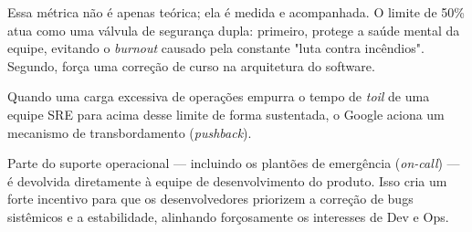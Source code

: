 \documentclass[12pt,a4paper,twoside]{report}
\begin{document}
Essa métrica não é apenas teórica; ela é medida e acompanhada. O limite de 50\% atua como uma válvula de segurança dupla: primeiro, protege a saúde mental da equipe, evitando o \emph{burnout} causado pela constante "luta contra incêndios". Segundo, força uma correção de curso na arquitetura do software. 

Quando uma carga excessiva de operações empurra o tempo de \emph{toil} de uma equipe SRE para acima desse limite de forma sustentada, o Google aciona um mecanismo de transbordamento (\emph{pushback}). 

Parte do suporte operacional --- incluindo os plantões de emergência (\emph{on-call}) --- é devolvida diretamente à equipe de desenvolvimento do produto. Isso cria um forte incentivo para que os desenvolvedores priorizem a correção de bugs sistêmicos e a estabilidade, alinhando forçosamente os interesses de Dev e Ops.
\end{document}
